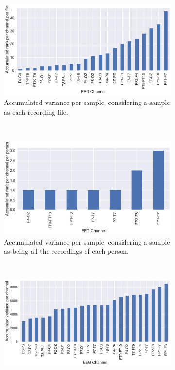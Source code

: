 \begin{figure}[!ht]
\begin{subfigure}{\linewidth}
\centering
\includegraphics[width=\linewidth]{figure/variance_per_file.pdf}
\caption{Accumulated variance per sample, considering a sample as each recording file.}
\label{fig:variance_per_file}
\end{subfigure}\\
\begin{subfigure}{\linewidth}
\centering
\includegraphics[width=\linewidth]{figure/variance_per_person.pdf}
\caption{Accumulated variance per sample, considering a sample as being all the recordings of each person.}
\label{fig:variance_per_person}
\end{subfigure}\\
\begin{subfigure}{\linewidth}
\centering
\includegraphics[width=\linewidth]{figure/variance_all.pdf}

\end{subfigure}
\end{figure}
